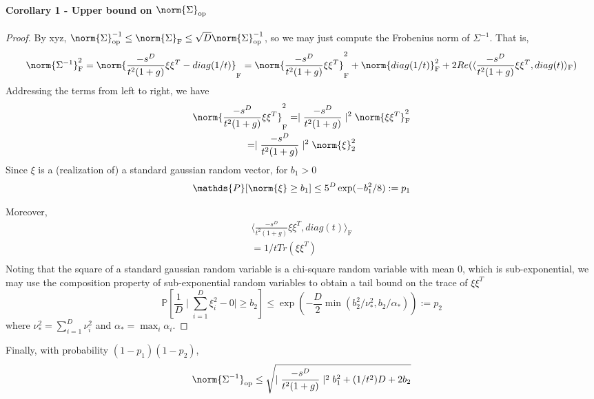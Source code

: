     \paragraph{Corollary 1 - Upper bound on $\norm{\Sigma}_{\text{op}}$}
    \begin{proof}
        By xyz, $\norm{\Sigma}^{-1}_{\text{op}} \leq \norm{\Sigma}_{\text{F}}\leq \sqrt{D}\norm{\Sigma}^{-1}_{\text{op}}$, so we may just compute the Frobenius norm of $\Sigma^{-1}$. That is,
        \begin{equation*}
            \norm{\Sigma^{-1}}^2_{\text{F}} = \norm{\frac{-s^D}{t^2(1+g)} \xi \xi^T - diag(1/t)}_{\text{F}}=%
            \norm{\frac{-s^D}{t^2(1+g)} \xi \xi^T}^2_{\text{F}} + \norm{diag(1/t)}^2_{\text{F}} + 2Re(\langle \frac{-s^D}{t^2(1+g)} \xi \xi^T, diag(t)\rangle_{\text{F}}) \\
        \end{equation*}
        Addressing the terms from left to right, we have
        \begin{gather*}
            \norm{\frac{-s^D}{t^2(1+g)} \xi \xi^T}^2_{\text{F}} = \mid \frac{-s^D}{t^2(1+g)}\mid^2 \norm{\xi \xi^T}^2_{\text{F}} \\
            = \mid\frac{-s^D}{t^2(1+g)}\mid^2 \norm{\xi}_2^2
        \end{gather*}
        Since $\xi$ is a (realization of) a standard gaussian random vector, for $b_1 > 0$ 
        \begin{equation*}
            \mathds{P}[\norm{\xi} \geq b_1] \leq 5^D \exp(-b_1^2/8) := p_1
        \end{equation*}

        Moreover, 
        \begin{gather*}
            \langle \frac{-s^D}{t^2(1+g)} \xi \xi^T, diag(t)\rangle_{\text{F}} \\
            = 1/t Tr(\xi \xi^T) \\
        \end{gather*}
        Noting that the square of a standard gaussian random variable is a chi-square random variable with mean 0, which is sub-exponential, we may use the composition property of sub-exponential random variables to obtain a tail bound on the trace of $\xi \xi^T$
        \begin{equation*}
            \mathds{P}[\frac{1}{D}\mid \sum_{i=1}^D \xi_i^2 - 0\mid \geq b_2] \leq \exp(-\frac{D}{2} \min(b_2^2/\nu_*^2, b_2/\alpha_*)) := p_2
        \end{equation*}
        where $\nu_*^2 = \sum_{i=1}^D \nu_i^2$ and $\alpha_* = \max_i \alpha_i$.
    \end{proof}
    Finally, with probability $(1-p_1)(1-p_2)$, 
    \begin{equation*}
        \norm{\Sigma^{-1}}_{\text{op}} \leq \sqrt{\mid\frac{-s^D}{t^2(1+g)}\mid^2 b_1^2 + (1/t^2)D + 2b_2}
    \end{equation*}



